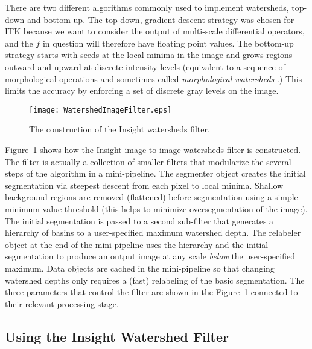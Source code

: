 There are two different algorithms commonly used to implement watersheds,
top-down and bottom-up.  The top-down, gradient descent strategy was chosen for
ITK because we want to consider the output of multi-scale differential
operators, and the $f$ in question will therefore have floating point
values. The bottom-up strategy starts with seeds at the local minima in the
image and grows regions outward and upward at discrete intensity levels
(equivalent to a sequence of morphological operations and sometimes called {\em
morphological watersheds} \cite{Serra1982}.) This limits the accuracy by
enforcing a set of discrete gray levels on the image.

\begin{figure}
\centering
\texttt{[image: WatershedImageFilter.eps]}
\caption{The construction of the Insight watersheds filter.}
\protect\label{fig:constructionWatersheds}
\end{figure}

Figure~\ref{fig:constructionWatersheds} shows how the Insight image-to-image
watersheds filter is constructed.  The filter is actually a collection of
smaller filters that modularize the several steps of the algorithm in a
mini-pipeline.  The segmenter object creates the initial segmentation via
steepest descent from each pixel to local minima. Shallow background regions
are removed (flattened) before segmentation using a simple minimum value
threshold (this helps to minimize oversegmentation of the image).  The initial
segmentation is passed to a second sub-filter that generates a hierarchy of
basins to a user-specified maximum watershed depth.  The relabeler object at
the end of the mini-pipeline uses the hierarchy and the initial segmentation to
produce an output image at any scale {\em below} the user-specified maximum.
Data objects are cached in the mini-pipeline so that changing watershed depths
only requires a (fast) relabeling of the basic segmentation.  The three
parameters that control the filter are shown in the
Figure~\ref{fig:constructionWatersheds} connected to their relevant processing
stage.

\subsection{Using the Insight Watershed Filter}
\label{sec:UsingWatersheds}



